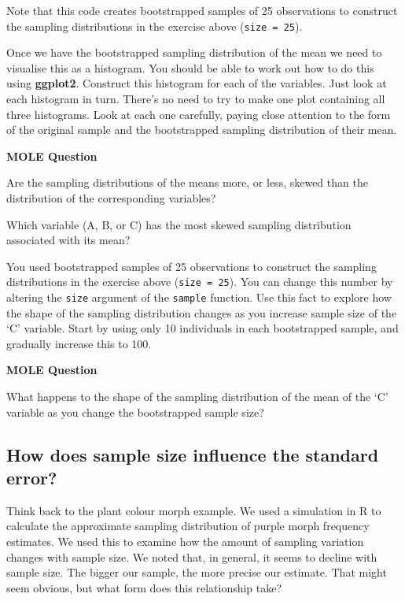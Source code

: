 \documentclass[]{book}
\begin{document}
Note that this code creates bootstrapped samples of 25 observations to
construct the sampling distributions in the exercise above
(\texttt{size\ =\ 25}).

Once we have the bootstrapped sampling distribution of the mean we need
to visualise this as a histogram. You should be able to work out how to
do this using \textbf{ggplot2}. Construct this histogram for each of the
variables. Just look at each histogram in turn. There's no need to try
to make one plot containing all three histograms. Look at each one
carefully, paying close attention to the form of the original sample and
the bootstrapped sampling distribution of their mean.

\begin{do-something}
\textbf{MOLE Question}

Are the sampling distributions of the means more, or less, skewed than
the distribution of the corresponding variables?

Which variable (A, B, or C) has the most skewed sampling distribution
associated with its mean?
\end{do-something}

You used bootstrapped samples of 25 observations to construct the
sampling distributions in the exercise above (\texttt{size\ =\ 25}). You
can change this number by altering the \texttt{size} argument of the
\texttt{sample} function. Use this fact to explore how the shape of the
sampling distribution changes as you increase sample size of the `C'
variable. Start by using only 10 individuals in each bootstrapped
sample, and gradually increase this to 100.

\begin{do-something}
\textbf{MOLE Question}

What happens to the shape of the sampling distribution of the mean of
the `C' variable as you change the bootstrapped sample size?
\end{do-something}

\subsection{How does sample size influence the standard
error?}\label{how-does-sample-size-influence-the-standard-error}

Think back to the plant colour morph example. We used a simulation in R
to calculate the approximate sampling distribution of purple morph
frequency estimates. We used this to examine how the amount of sampling
variation changes with sample size. We noted that, in general, it seems
to decline with sample size. The bigger our sample, the more precise our
estimate. That might seem obvious, but what form does this relationship
take?
\end{document}
